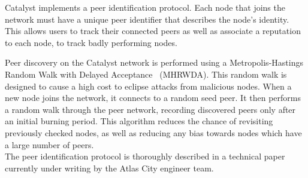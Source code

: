 Catalyst implements a peer identification protocol. Each node that joins the network must have a unique peer identifier that describes the node’s identity. This allows users to track their connected peers as well as associate a reputation to each node, to track badly performing nodes. \\

\begin{comment}
A peer identifier consists of the following set of parameters:
\begin{itemize}
\item \textbf{Client ID} - a 2-byte number to differentiate test networks from live network
\item \textbf{Client Version} - a 2-byte version number of the code running on peer 
\item \textbf{IP} - a 16-byte (IPv4 or IPv6) IP address
\item \textbf{Port} - a 2 byte port number 
\item \textbf{Public Key} - a 32-byte public key
\end{itemize}
\end{comment}


Peer discovery on the Catalyst network is performed using a Metropolis-Hastings Random Walk with Delayed Acceptance~\cite{hasting} (MHRWDA). This random walk is designed to cause a high cost to eclipse attacks from malicious nodes. When a new node joins the network, it connects to a random seed peer. It then performs a random walk through the peer network, recording discovered peers only after an initial burning period. This algorithm reduces the chance of revisiting previously checked nodes, as well as reducing any bias towards nodes which have a large number of peers. \\

The peer identification protocol is thoroughly described in a technical paper currently under writing by the Atlas City engineer team. 

